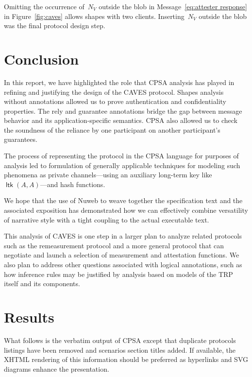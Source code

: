 \documentclass[titlepage,12pt]{article}
\newif\ifshowresults
\theoremstyle{definition}
\DeclareMathOperator{\ltk}{\mathsf{ltk}}
\begin{document}
Omitting the occurrence of~$N_V$ outside the blob in
Message~\ref{eq:attester response} in Figure~\ref{fig:caves} allows
shapes with two clients.  Inserting~$N_V$ outside the blob was the
final protocol design step.

\section{Conclusion}

In this report, we have highlighted the role that CPSA analysis has
played in refining and justifying the design of the CAVES
protocol. Shapes analysis without annotations allowed us to prove
authentication and confidentiality properties.  The rely and guarantee
annotations bridge the gap between message behavior and its
application-specific semantics. CPSA also allowed us to check the
soundness of the reliance by one participant on another participant's
guarantees.

The process of representing the protocol in the CPSA language for
purposes of analysis led to formulation of generally applicable
techniques for modeling such phenomena as private channels---using an
auxiliary long-term key like $\ltk(A,A)$---and hash functions.

We hope that the use of Nuweb to weave together the specification text
and the associated exposition has demonstrated how we can effectively
combine versatility of narrative style with a tight coupling to the
actual executable text.

This analysis of CAVES is one step in a larger plan to analyze related
protocols such as the remeasurement protocol and a more general
protocol that can negotiate and launch a selection of measurement and
attestation functions.  We also plan to address other questions
associated with logical annotations, such as how inference rules may
be justified by analysis based on models of the TRP itself and its
components.




\ifshowresults
\appendix

\section{Results}

What follows is the verbatim output of CPSA except that duplicate
protocols listings have been removed and scenarios section titles
added.  If available, the XHTML rendering of this information should
be preferred as hyperlinks and SVG diagrams enhance the presentation.
\end{document}
